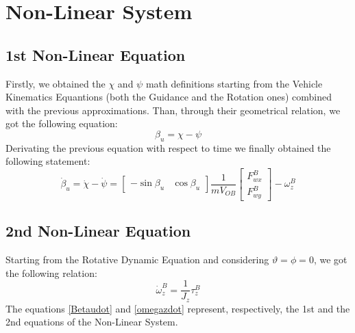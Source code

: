 \documentclass[a4paper,12pt,titlepage]{report}
\begin{document}
\section{Non-Linear System}
	\subsection{1st Non-Linear Equation} 	
		Firstly, we obtained the $\chi$ and $\psi$ math definitions starting from the Vehicle Kinematics Equantions (both the Guidance and the Rotation ones) combined with the previous approximations. Than, through their geometrical relation, we got the following equation:
			\begin{equation}
				\beta_{u} = \chi - \psi
			\end{equation}
			Derivating the previous equation with respect to time we finally obtained the following statement:
			\begin{equation} \label{Betaudot}
				\dot{\beta}_{u} = \dot\chi - \dot\psi = 
				\begin{bmatrix}
				- \sin\beta_{u} & \cos\beta_{u}
				\end{bmatrix}
				\frac{1}{mV_{OB}}
				\begin{bmatrix}
				F_{wx}^{B} \\ F_{wy}^{B}
				\end{bmatrix}
				-\omega_{z}^{B}
			\end{equation}
	\subsection{2nd Non-Linear Equation}
		Starting from the Rotative Dynamic Equation and considering $\vartheta = \phi = 0$, we got the following relation:
			\begin{equation} \label{omegazdot}
				\dot{\omega}_{z}^{B} = \frac{1}{J_{z}} \tau_{z}^{B}
			\end{equation}
		The equations \ref{Betaudot} and \ref{omegazdot} represent, respectively, the 1st and the 2nd equations of the Non-Linear System.
\end{document}
